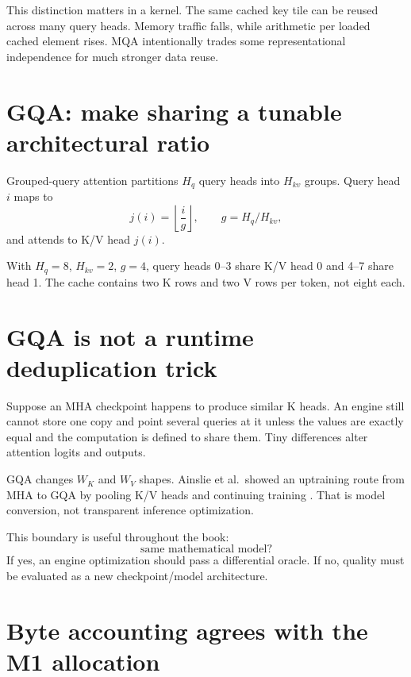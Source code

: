 This distinction matters in a kernel. The same cached key tile can be reused across
many query heads. Memory traffic falls, while arithmetic per loaded cached element
rises. MQA intentionally trades some representational independence for much stronger
data reuse.

\section{GQA: make sharing a tunable architectural ratio}

Grouped-query attention partitions $H_q$ query heads into $H_{kv}$ groups. Query head
$i$ maps to
\[
j(i)=\left\lfloor\frac{i}{g}\right\rfloor,\qquad
g=H_q/H_{kv},
\]
and attends to K/V head $j(i)$.

With $H_q=8$, $H_{kv}=2$, $g=4$, query heads 0--3 share K/V head 0 and 4--7 share
head 1. The cache contains two K rows and two V rows per token, not eight each.


\section{GQA is not a runtime deduplication trick}

Suppose an MHA checkpoint happens to produce similar K heads. An engine still cannot
store one copy and point several queries at it unless the values are exactly equal and
the computation is defined to share them. Tiny differences alter attention logits and
outputs.

GQA changes $W_K$ and $W_V$ shapes. Ainslie et al.\ showed an uptraining route from
MHA to GQA by pooling K/V heads and continuing training \cite{ainslie2023gqa}. That is
model conversion, not transparent inference optimization.

This boundary is useful throughout the book:
\[
\boxed{\text{same mathematical model?}}
\]
If yes, an engine optimization should pass a differential oracle. If no, quality must
be evaluated as a new checkpoint/model architecture.

\section{Byte accounting agrees with the M1 allocation}

